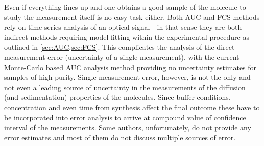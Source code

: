 \documentclass{doctoral}
\begin{document}
Even if everything lines up and one obtains a good sample of the molecule to study the measurement itself is no easy task either.
Both AUC and FCS methods rely on time-series analysis of an optical signal - in that sense they are both indirect methods requiring model fitting within the experimental procedure as outlined in \ref{sec:AUC,sec:FCS}.
This complicates the analysis of the direct measurement error (uncertainty of a single measurement), with the current Monte-Carlo based AUC analysis method providing no uncertainty estimates for samples of high purity.
Single measurement error, however, is not the only and not even a leading source of uncertainty in the measurements of the diffusion (and sedimentation) properties of the molecules.
Since buffer conditions, concentration and even time from synthesis\cite{Nag_2011} affect the final outcome these have to be incorporated into error analysis to arrive at compound value of confidence interval of the measurements.
Some authors, unfortunately, do not provide any error estimates\cite{Poznar_2017,Khaymina_2007} and most of them do not discuss multiple sources of error.
\end{document}
